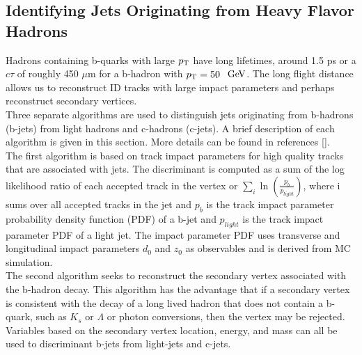 \subsection{Identifying Jets Originating from Heavy Flavor Hadrons}
\label{sec:jet:btagging}

\indent Hadrons containing b-quarks with large $p_{\mathrm{T}}$ have long lifetimes, around 1.5 ps or a $c\tau$ of roughly 450 $\mu$m for a b-hadron with $p_{\mathrm{T}} = 50$ $\gev$.  The long flight distance allows us to reconstruct ID tracks with large impact parameters and perhaps reconstruct secondary vertices. \\%

\indent Three separate algorithms are used to distinguish jets originating from b-hadrons (b-jets) from light hadrons and c-hadrons (c-jets).  A brief description of each algorithm is given in this section.  More details can be found in references [\cite{btagging2016,btagging2015}].  \\

\indent The first algorithm is based on track impact parameters for high quality tracks that are associated with jets.  The discriminant is computed as a sum of the log likelihood ratio of each accepted track in the vertex or $\sum_i \ln(\frac{p_b}{p_{light}})$, where i sums over all accepted tracks in the jet and $p_b$ is the track impact parameter probability density function (PDF) of a b-jet and $p_{light}$ is the track impact parameter PDF of a light jet.  The impact parameter PDF uses transverse and longitudinal impact parameters $d_0$ and $z_0$ as observables and is derived from MC simulation.  \\

\indent The second algorithm seeks to reconstruct the secondary vertex associated with the b-hadron decay.  This algorithm has the advantage that if a secondary vertex is consistent with the decay of a long lived hadron that does not contain a b-quark, such as $K_s$ or $\Lambda$ or photon conversions, then the vertex may be rejected. Variables based on the secondary vertex location, energy, and mass can all be used to discriminant b-jets from light-jets and c-jets. \\%

